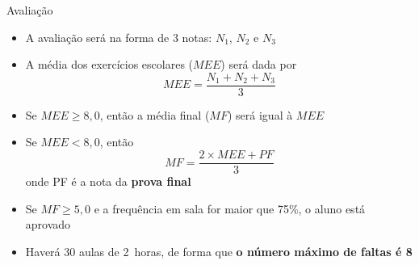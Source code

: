 \begin{frame}{Avaliação}
    \begin{itemize}
        \item A avaliação será na forma de 3 notas: \(N_1\), \(N_2\) e \(N_3\)
        \item A média dos exercícios escolares (\(MEE\)) será dada por
            \[
                MEE=\frac{N_1+N_2+N_3}{3}
            \]
        \item Se \(MEE \geq 8,0\), então a média final (\(MF\)) será igual à \(MEE\)
        \item Se \(MEE < 8,0\), então
            \[
                MF=\frac{2\times MEE+PF}{3}
            \]
            onde PF é a nota da \textbf{prova final}
        \item Se \(MF \geq 5,0\) e a frequência em sala for maior que 75\%, o aluno está aprovado
        \item Haverá 30 aulas de \SI{2}{horas}, de forma que \textbf{o número máximo de faltas é 8}
    \end{itemize}
\end{frame}
